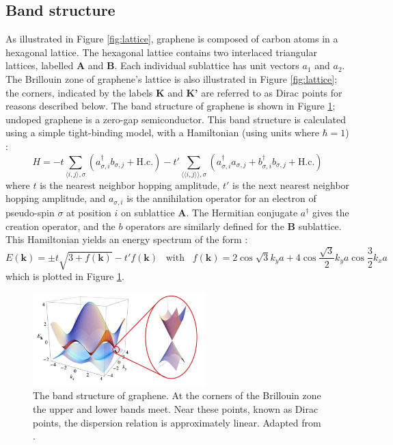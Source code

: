 \documentclass[edeposit,fullpage,draftthesis]{uiucthesis2009}
\begin{document}
	\subsection{Band structure}
    	
        As illustrated in Figure \ref{fig:lattice}, graphene is composed of carbon atoms in a hexagonal lattice. The hexagonal lattice contains two interlaced triangular lattices, labelled \textbf{A} and \textbf{B}. Each individual sublattice has unit vectors $a_1$ and $a_2$. The Brillouin zone of graphene's lattice is also illustrated in Figure \ref{fig:lattice}; the corners, indicated by the labels \textbf{K} and \textbf{K'} are referred to as Dirac points for reasons described below. 
        The band structure of graphene is shown in Figure \ref{fig:bandstructure}; undoped graphene is a zero-gap semiconductor. This band structure is calculated using a simple tight-binding model, with a Hamiltonian (using units where $\hbar=1$) \cite{CastroNeto2009}:
        \begin{equation}
        H = - t \sum\limits_{\langle i,j\rangle,\sigma} (a_{\sigma,i}^\dagger b_{\sigma,j} + \text{H.c.})
        - t' \sum\limits_{\langle\langle i,j\rangle\rangle,\sigma} (a_{\sigma,i}^\dagger a_{\sigma,j} + b_{\sigma,i}^\dagger b_{\sigma,j} + \text{H.c.})
        \end{equation}
        where $t$ is the nearest neighbor hopping amplitude, $t'$ is the next nearest neighbor hopping amplitude, and $a_{\sigma,i}$ is the annihilation operator for an electron of pseudo-spin $\sigma$ at position $i$ on sublattice \textbf{A}. The Hermitian conjugate $a^\dagger$ gives the creation operator, and the $b$ operators are similarly defined for the \textbf{B} sublattice. This Hamiltonian yields an energy spectrum of the form \cite{CastroNeto2009}:
        \begin{equation}
        E(\mathbf{k}) = \pm t \sqrt{3 + f(\mathbf{k})} - t' f(\mathbf{k}) \;\;\; \text{with} \;\;\; f(\mathbf{k}) = 2 \cos{\sqrt{3} k_y a } + 4 \cos{\frac{\sqrt{3}}{2} k_y a} \cos{\frac{3}{2} k_x a}
        \end{equation} 
        which is plotted in Figure \ref{fig:bandstructure}.
   
        \begin{figure}
        \centering
        \includegraphics[width=0.6\textwidth]{images/background/ElecPropertiesFig3.png}
        \caption[The band structure of graphene]{The band structure of graphene. At the corners of the Brillouin zone the upper and lower bands meet. Near these points, known as Dirac points, the dispersion relation is approximately linear. Adapted from \cite{CastroNeto2009}.}
        \label{fig:bandstructure}
        \end{figure}
    
\end{document}

